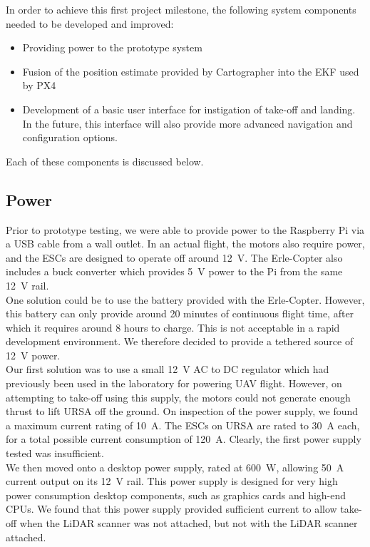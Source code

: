 \documentclass[capstone_report.tex]{subfiles}
\begin{document}
In order to achieve this first project milestone, the following system components needed to be developed and improved:
\begin{itemize}
	\item Providing power to the prototype system
	\item Fusion of the position estimate provided by Cartographer into the EKF used by PX4
	\item Development of a basic user interface for instigation of take-off and landing. In the future, this interface will also provide more advanced navigation and configuration options.
\end{itemize}

Each of these components is discussed below.

\subsection{Power}
Prior to prototype testing, we were able to provide power to the Raspberry Pi via a USB cable from a wall outlet. In an actual flight, the motors also require power, and the ESCs are designed to operate off around \SI{12}{\volt}. The Erle-Copter also includes a buck converter which provides \SI{5}{\volt} power to the Pi from the same \SI{12}{\volt} rail.\\

One solution could be to use the battery provided with the Erle-Copter. However, this battery can only provide around 20 minutes of continuous flight time, after which it requires around 8 hours to charge. This is not acceptable in a rapid development environment. We therefore decided to provide a tethered source of \SI{12}{\volt} power.\\

Our first solution was to use a small \SI{12}{\volt} AC to DC regulator which had previously been used in the laboratory for powering UAV flight. However, on attempting to take-off using this supply, the motors could not generate enough thrust to lift URSA off the ground. On inspection of the power supply, we found a maximum current rating of \SI{10}{\ampere}. The ESCs on URSA are rated to \SI{30}{\ampere} each, for a total possible current consumption of \SI{120}{\ampere}. Clearly, the first power supply tested was insufficient. \\

We then moved onto a desktop power supply, rated at \SI{600}{\watt}, allowing \SI{50}{\ampere} current output on its \SI{12}{\volt} rail. This power supply is designed for very high power consumption desktop components, such as graphics cards and high-end CPUs. We found that this power supply provided sufficient current to allow take-off when the LiDAR scanner was not attached, but not with the LiDAR scanner attached.\\
\end{document}
